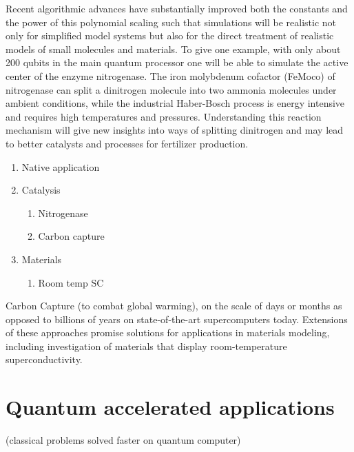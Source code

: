 \documentclass[journal]{IEEEtran}
\begin{document}
Recent algorithmic advances have substantially improved both the constants and the power of this polynomial scaling such that simulations will be realistic not only for simplified model systems but also for the direct  treatment of realistic models of small molecules and materials. To give one example, with only about 200 qubits in the main quantum processor one will be able to simulate the active center of the enzyme nitrogenase. The iron molybdenum cofactor (FeMoco) of nitrogenase can split a dinitrogen molecule into two ammonia molecules under ambient conditions, while the industrial Haber-Bosch process  is energy intensive and requires high temperatures and pressures. Understanding this reaction mechanism will give new insights into ways of splitting dinitrogen and may lead to better catalysts and processes for fertilizer production.

\begin{enumerate}
\item      Native application
\item     Catalysis
\begin{enumerate}
                               \item         Nitrogenase
                           \item        Carbon capture
\end{enumerate}
\item      Materials
 \begin{enumerate}
                           \item         Room temp SC
\end{enumerate}
\end{enumerate}


 Carbon Capture (to combat global warming), on the scale of days or months as opposed to billions of years on state-of-the-art supercomputers today.  Extensions of these approaches promise solutions for applications in materials modeling, including investigation of materials that display room-temperature superconductivity. 




\section{Quantum accelerated applications}
 (classical problems solved faster on quantum computer)
\end{document}
